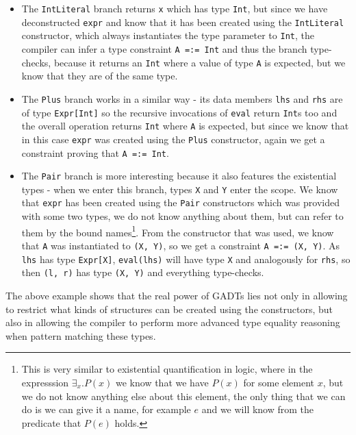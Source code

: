 \begin{itemize}
  \item The \texttt{IntLiteral} branch returns \texttt{x} which has type \texttt{Int}, but since we have deconstructed \texttt{expr} and know that it has been created using the \texttt{IntLiteral} constructor, which always instantiates the type parameter to \texttt{Int}, the compiler can infer a type constraint \texttt{A =:= Int} and thus the branch type-checks, because it returns an \texttt{Int} where a value of type \texttt{A} is expected, but we know that they are of the same type.
  
  \item The \texttt{Plus} branch works in a similar way - its data members \texttt{lhs} and \texttt{rhs} are of type \texttt{Expr[Int]} so the recursive invocations of \texttt{eval} return \texttt{Int}s too and the overall operation returns \texttt{Int} where \texttt{A} is expected, but since we know that in this case \texttt{expr} was created using the \texttt{Plus} constructor, again we get a constraint proving that \texttt{A =:= Int}.
  
  \item The \texttt{Pair} branch is more interesting because it also features the existential types - when we enter this branch, types \texttt{X} and \texttt{Y} enter the scope. We know that \texttt{expr} has been created using the \texttt{Pair} constructors which was provided with some two types, we do not know anything about them, but can refer to them by the bound names\footnote{This is very similar to existential quantification in logic, where in the expresssion $\exists_x. P(x)$ we know that we have $P(x)$ for some element $x$, but we do not know anything else about this element, the only thing that we can do is we can give it a name, for example $e$ and we will know from the predicate that $P(e)$ holds.}. From the constructor that was used, we know that \texttt{A} was instantiated to \texttt{(X, Y)}, so we get a constraint \texttt{A =:= (X, Y)}. As \texttt{lhs} has type \texttt{Expr[X]}, \texttt{eval(lhs)} will have type \texttt{X} and analogously for \texttt{rhs}, so then \texttt{(l, r)} has type \texttt{(X, Y)} and everything type-checks.
\end{itemize}

The above example shows that the real power of GADTs lies not only in allowing to restrict what kinds of structures can be created using the constructors, but also in allowing the compiler to perform more advanced type equality reasoning when pattern matching these types.

